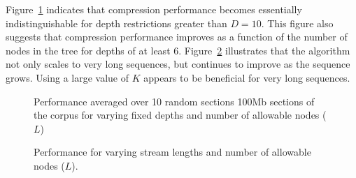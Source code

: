 Figure~\ref{fig:varying_depths} indicates that compression performance becomes essentially indistinguishable for depth restrictions greater than $D=10$.  This figure also suggests that compression performance improves as a function of the number of nodes in the tree for depths of at  least 6.  Figure~\ref{fig:varying_stream_length} illustrates that the algorithm not only scales to very long sequences, but continues to improve as the sequence grows.  Using a large value of $K$ appears to be beneficial for very long sequences.

\begin{figure}[t] 
	\begin{center}
		\caption{Performance averaged over 10 random sections  100Mb sections of the corpus for varying fixed depths and number of allowable nodes ($L$) }
		\label{fig:varying_depths}
	\end{center} 
\end{figure} 


\begin{figure}[t] 
	\begin{center}
		\caption{Performance for varying stream lengths and number of allowable nodes ($L$).}
		\label{fig:varying_stream_length}
	\end{center} 
\end{figure} 


